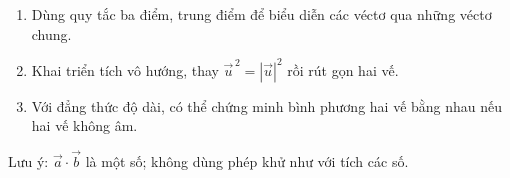 \begin{enumerate}
\item Dùng quy tắc ba điểm, trung điểm để biểu diễn các véctơ qua những véctơ chung.
\item Khai triển tích vô hướng, thay $\overrightarrow{u}^{\,2}=|\overrightarrow{u}|^2$ rồi rút gọn hai vế.
\item Với đẳng thức độ dài, có thể chứng minh bình phương hai vế bằng nhau nếu hai vế không âm.
\end{enumerate}
Lưu ý: $\overrightarrow{a}\cdot\overrightarrow{b}$ là một số; không dùng phép khử như với tích các số.
